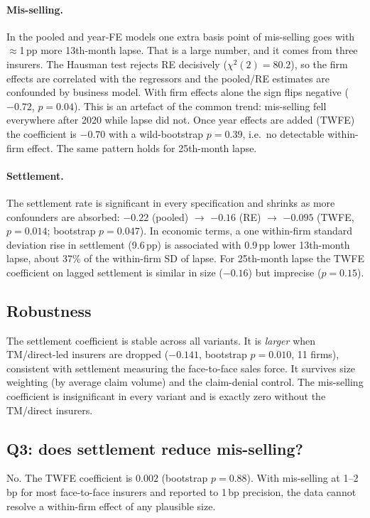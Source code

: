 \documentclass[11pt,a4paper]{article}
\begin{document}
\paragraph{Mis-selling.} In the pooled and year-FE models one extra basis point of mis-selling goes with
$\approx$1\,pp more 13th-month lapse. That is a large number, and it comes from three insurers. The Hausman test rejects
RE decisively ($\chi^2(2)=80.2$), so the firm effects are correlated with the regressors and the pooled/RE
estimates are confounded by business model. With firm effects alone the sign flips negative ($-0.72$, $p=0.04$).
This is an artefact of the common trend: mis-selling fell everywhere after 2020 while lapse did not. Once year
effects are added (TWFE) the coefficient is $-0.70$ with a wild-bootstrap $p=0.39$, i.e.\ no detectable
within-firm effect. The same pattern holds for 25th-month lapse.

\paragraph{Settlement.} The settlement rate is significant in every specification and shrinks as more
confounders are absorbed: $-0.22$ (pooled) $\to$ $-0.16$ (RE) $\to$ $-0.095$ (TWFE, $p=0.014$; bootstrap $p=0.047$).
In economic terms, a one within-firm standard deviation rise in settlement (9.6\,pp) is associated with
0.9\,pp lower 13th-month lapse, about 37\% of the within-firm SD of lapse. For 25th-month lapse the TWFE
coefficient on lagged settlement is similar in size ($-0.16$) but imprecise ($p=0.15$).

\subsection{Robustness}
\begin{table}[H]\centering\small
\caption{Robustness of the two-way FE model for 13th-month lapse.}

\end{table}
\noindent The settlement coefficient is stable across all variants. It is \emph{larger} when TM/direct-led insurers
are dropped ($-0.141$, bootstrap $p=0.010$, 11 firms), consistent with settlement measuring the face-to-face
sales force. It survives size weighting (by average claim volume) and the claim-denial control. The mis-selling
coefficient is insignificant in every variant and is exactly zero without the TM/direct insurers.

\subsection{Q3: does settlement reduce mis-selling?}
\begin{table}[H]\centering\small
\caption{Mis-selling rate$_t$ (bp), non-life.}

\end{table}
\noindent No. The TWFE coefficient is $0.002$ (bootstrap $p=0.88$). With mis-selling at 1--2\,bp for most
face-to-face insurers and reported to 1\,bp precision, the data cannot resolve a within-firm effect of any
plausible size.
\end{document}

